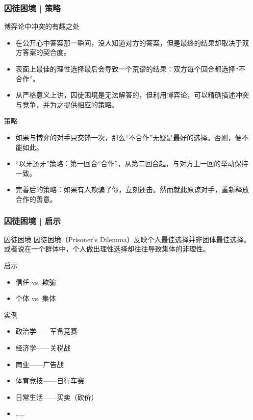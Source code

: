\begin{frame}
  \frametitle{囚徒困境 | 策略}
  \begin{block}{博弈论中冲突的有趣之处}
    \begin{itemize}
      \item 在公开心中答案那一瞬间，没人知道对方的答案，但是最终的结果却取决于双方答案的契合度。
      \item 表面上最佳的理性选择最后会导致一个荒谬的结果：双方每个回合都选择“不合作”。
      \item 从严格意义上讲，囚徒困境是无法解答的，但利用博弈论，可以精确描述冲突与竞争，并为之提供相应的策略。
    \end{itemize}
  \end{block}
  \vspace{-0.3em}
  \pause
  \begin{block}{\alert{策略}}
    \begin{itemize}
      \item 如果与博弈的对手只交锋一次，那么“不合作”无疑是最好的选择。否则，便不能如此。
      \item “以牙还牙”策略：第一回合“合作”，从第二回合起，与对方上一回的举动保持一致。
      \item 完善后的策略：如果有人欺骗了你，立刻还击。然而就此原谅对手，重新释放合作的善意。
    \end{itemize}
  \end{block}
\end{frame}

\begin{frame}
  \frametitle{囚徒困境 | 启示}
  \begin{block}{囚徒困境}
    囚徒困境（Prisoner's Dilemma）反映个人最佳选择并非团体最佳选择。或者说在一个群体中，个人做出理性选择却往往导致集体的非理性。
  \end{block}
  \pause
  \begin{block}{启示}
    \begin{itemize}
      \item 信任 vs. 欺骗 
      \item 个体 vs. 集体
    \end{itemize}
  \end{block}
  \pause
  \begin{block}{实例}
    \begin{itemize}
      \item 政治学——军备竞赛
      \item 经济学——关税战
      \item 商业——广告战
      \item 体育竞技——自行车赛
      \item 日常生活——买卖（砍价）
      \item ……
    \end{itemize}
  \end{block}
\end{frame}

